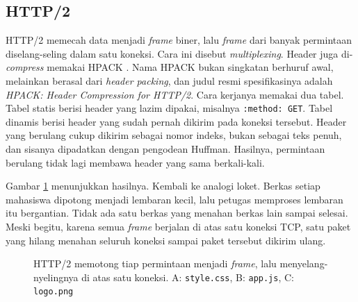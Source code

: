 \subsection*{HTTP/2}

HTTP/2 \cite{rfc9113} memecah data menjadi \textit{frame} biner, lalu \textit{frame}
dari banyak permintaan
diselang-seling dalam satu koneksi. Cara ini disebut \textit{multiplexing}.
Header juga di-\textit{compress} memakai HPACK \cite{rfc7541}. Nama HPACK bukan
singkatan berhuruf awal, melainkan berasal dari \textit{header packing}, dan
judul resmi spesifikasinya adalah \textit{HPACK: Header Compression for
HTTP/2}. Cara kerjanya memakai dua tabel. Tabel statis berisi header yang lazim
dipakai, misalnya \texttt{:method: GET}. Tabel dinamis berisi header yang sudah
pernah dikirim pada koneksi tersebut. Header yang berulang cukup dikirim sebagai
nomor indeks, bukan sebagai teks penuh, dan sisanya dipadatkan dengan pengodean
Huffman. Hasilnya, permintaan berulang tidak lagi membawa header yang sama
berkali-kali.

Gambar \ref{fig:http2} menunjukkan hasilnya. Kembali ke analogi loket. Berkas
setiap mahasiswa dipotong menjadi lembaran kecil, lalu petugas memproses
lembaran itu bergantian. Tidak ada satu berkas yang menahan berkas lain sampai
selesai. Meski begitu, karena semua \textit{frame} berjalan di atas satu
koneksi TCP, satu paket yang hilang menahan seluruh koneksi sampai paket
tersebut dikirim ulang.

\begin{figure}[!htb]
  \centering
  \caption{HTTP/2 memotong tiap permintaan menjadi \textit{frame}, lalu
           menyelang-nyelingnya di atas satu koneksi. A: \texttt{style.css},
           B: \texttt{app.js}, C: \texttt{logo.png}}
  \label{fig:http2}
\end{figure}

